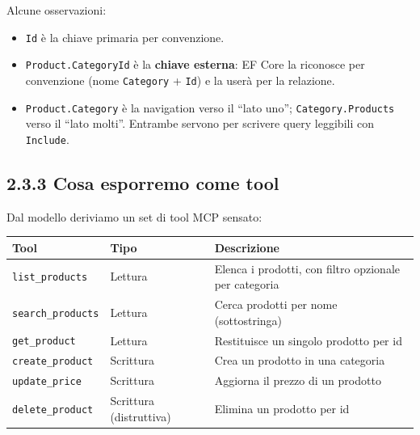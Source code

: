 \documentclass[
  italian,
  10pt,
]{book}
\newcounter{none} %
\providecommand{\tightlist}{%
  \setlength{\itemsep}{0pt}\setlength{\parskip}{0pt}}
\begin{document}
Alcune osservazioni:

\begin{itemize}
\tightlist
\item
  \texttt{Id} è la chiave primaria per convenzione.
\item
  \texttt{Product.CategoryId} è la \textbf{chiave esterna}: EF Core la
  riconosce per convenzione (nome \texttt{Category} + \texttt{Id}) e la
  userà per la relazione.
\item
  \texttt{Product.Category} è la navigation verso il ``lato uno'';
  \texttt{Category.Products} verso il ``lato molti''. Entrambe servono
  per scrivere query leggibili con \texttt{Include}.
\end{itemize}

\subsection{2.3.3 Cosa esporremo come
tool}\label{cosa-esporremo-come-tool}

Dal modello deriviamo un set di tool MCP sensato:

{\def\LTcaptype{none} %
\begin{longtable}[]{@{}
  >{\raggedright\arraybackslash}p{}
  >{\raggedright\arraybackslash}p{}
  >{\raggedright\arraybackslash}p{}@{}}
\toprule\noalign{}
\begin{minipage}[b]{\linewidth}\raggedright
Tool
\end{minipage} & \begin{minipage}[b]{\linewidth}\raggedright
Tipo
\end{minipage} & \begin{minipage}[b]{\linewidth}\raggedright
Descrizione
\end{minipage} \\
\midrule\noalign{}
\endhead
\bottomrule\noalign{}
\endlastfoot
\texttt{list\_products} & Lettura & Elenca i prodotti, con filtro
opzionale per categoria \\
\texttt{search\_products} & Lettura & Cerca prodotti per nome
(sottostringa) \\
\texttt{get\_product} & Lettura & Restituisce un singolo prodotto per
id \\
\texttt{create\_product} & Scrittura & Crea un prodotto in una
categoria \\
\texttt{update\_price} & Scrittura & Aggiorna il prezzo di un
prodotto \\
\texttt{delete\_product} & Scrittura (distruttiva) & Elimina un prodotto
per id \\
\end{longtable}
}
\end{document}
